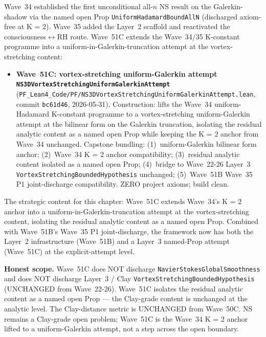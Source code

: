 \begin{remark}\label{rem:ns-wave51c-lean}
Wave~34 established the first unconditional all-$n$ NS result on the Galerkin-shadow via the named open Prop \texttt{UniformHadamardBoundAllN} (discharged axiom-free at K = 2). Wave~35 added the Layer~2 scaffold and reactivated the consciousness$\leftrightarrow$RH route. Wave~51C extends the Wave~34/35 K-constant programme into a uniform-in-Galerkin-truncation attempt at the vortex-stretching content:
\begin{itemize}
  \item \textbf{Wave~51C: vortex-stretching uniform-Galerkin attempt \texttt{NS3DVortexStretchingUniformGalerkinAttempt}} (\texttt{PF\_Lean4\_Code/PF/NS3DVortexStretchingUniformGalerkinAttempt.lean}, commit \texttt{bc61d46}, 2026-05-31). Construction: lifts the Wave~34 uniform-Hadamard K-constant programme to a vortex-stretching uniform-Galerkin attempt at the bilinear form on the Galerkin truncation, isolating the residual analytic content as a named open Prop while keeping the K = 2 anchor from Wave~34 unchanged. Capstone bundling: (1)~uniform-Galerkin bilinear form anchor; (2)~Wave~34 K = 2 anchor compatibility; (3)~residual analytic content isolated as a named open Prop; (4)~bridge to Wave~22-26 Layer~3 \texttt{VortexStretchingBoundedHypothesis} unchanged; (5)~Wave~51B Wave~35 P1 joint-discharge compatibility. ZERO project axioms; build clean.
\end{itemize}
The strategic content for this chapter: Wave~51C extends Wave~34's K = 2 anchor into a uniform-in-Galerkin-truncation attempt at the vortex-stretching content, isolating the residual analytic content as a named open Prop. Combined with Wave~51B's Wave~35 P1 joint-discharge, the framework now has both the Layer~2 infrastructure (Wave~51B) and a Layer~3 named-Prop attempt (Wave~51C) at the explicit-attempt level.

\textbf{Honest scope.} Wave~51C does NOT discharge \texttt{NavierStokesGlobalSmoothness} and does NOT discharge Layer~3 / Clay \texttt{VortexStretchingBoundedHypothesis} (UNCHANGED from Wave~22-26). Wave~51C isolates the residual analytic content as a named open Prop --- the Clay-grade content is unchanged at the analytic level. The Clay-distance metric is UNCHANGED from Wave~50C. NS remains a Clay-grade open problem; Wave~51C is the Wave~34 K = 2 anchor lifted to a uniform-Galerkin attempt, not a step across the open boundary.
\end{remark}

